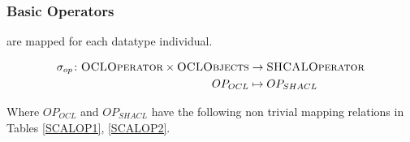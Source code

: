 \documentclass[runningheads]{llncs}
\begin{document}
\subsubsection{Basic Operators}
are mapped for each datatype individual.
\begin{definition}
    \begin{align*}
        \sigma_{op}\colon\textsc{OCLOperator}\times\textsc{OCLObjects} & \to\textsc{SHCALOperator} \\
        OP_{OCL}                                                       & \mapsto OP_{SHACL}
    \end{align*}
\end{definition}
Where \(OP_{OCL}\) and \(OP_{SHACL}\) have the following non trivial mapping relations in Tables \ref{SCALOP1}, \ref{SCALOP2}.
\end{document}
